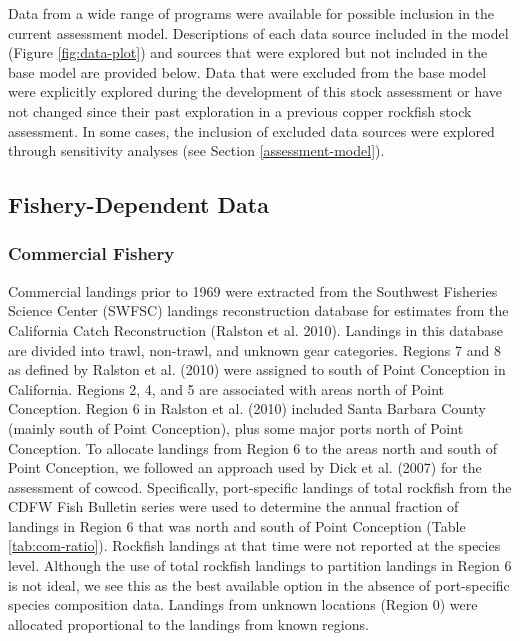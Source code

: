 \documentclass[11pt,
  english,
  letterpaper,
]{article}
\begin{document}
Data from a wide range of programs were available for possible inclusion in the current assessment model. Descriptions of each data source included in the model (Figure \ref{fig:data-plot}) and sources that were explored but not included in the base model are provided below. Data that were excluded from the base model were explicitly explored during the development of this stock assessment or have not changed since their past exploration in a previous copper rockfish stock assessment. In some cases, the inclusion of excluded data sources were explored through sensitivity analyses (see Section \ref{assessment-model}).

\hypertarget{fishery-dependent-data}{%
\subsection{Fishery-Dependent Data}\label{fishery-dependent-data}}

\hypertarget{commercial-fishery}{%
\subsubsection{Commercial Fishery}\label{commercial-fishery}}

Commercial landings prior to 1969 were extracted from the Southwest Fisheries Science Center (SWFSC) landings reconstruction database for estimates from the California Catch Reconstruction (Ralston et al. 2010). Landings in this database are divided into trawl, non-trawl, and unknown gear categories. Regions 7 and 8 as defined by Ralston et al. (2010) were assigned to south of Point Conception in California. Regions 2, 4, and 5 are associated with areas north of Point Conception. Region 6 in Ralston et al. (2010) included Santa Barbara County (mainly south of Point Conception), plus some major ports north of Point Conception. To allocate landings from Region 6 to the areas north and south of Point Conception, we followed an approach used by Dick et al. (2007) for the assessment of cowcod. Specifically, port-specific landings of total rockfish from the CDFW Fish Bulletin series were used to determine the annual fraction of landings in Region 6 that was north and south of Point Conception (Table \ref{tab:com-ratio}). Rockfish landings at that time were not reported at the species level. Although the use of total rockfish landings to partition landings in Region 6 is not ideal, we see this as the best available option in the absence of port-specific species composition data. Landings from unknown locations (Region 0) were allocated proportional to the landings from known regions.
\end{document}
